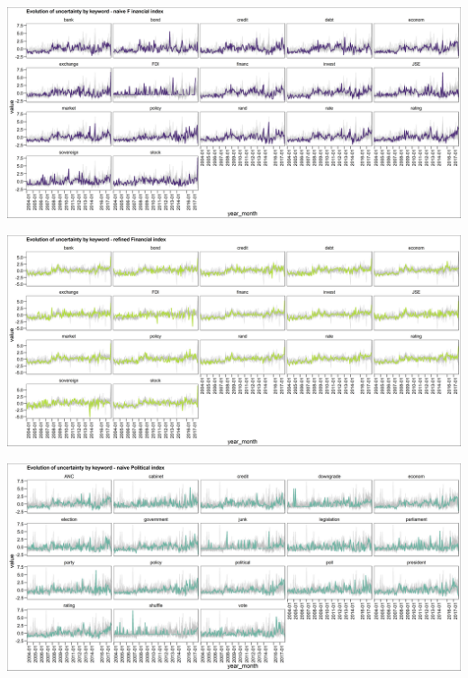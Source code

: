 \documentclass[11pt,preprint, authoryear]{elsarticle}
\let\origfigure\figure
\let\endorigfigure\endfigure
\renewenvironment{figure}[1][2] {
    \expandafter\origfigure\expandafter[H]
} {
    \endorigfigure
}
\numberwithin{equation}{section}
\numberwithin{figure}{section}
\numberwithin{table}{section}
\begin{document}
\begin{figure}
	\centering
	\includegraphics[width=\linewidth, keepaspectratio]{bin/financial_key_naive}\\
	
	\caption{Composite Financial market uncertainty naive index. \label{fig_fin_key_n}}
\end{figure}

\begin{figure}
	\centering
	\includegraphics[width=\linewidth, keepaspectratio]{bin/financial_key_refine}\\
	
	\caption{Composite Financial market uncertainty refined index. \label{fig_fin_key_r}}
\end{figure}

\begin{figure}
	\centering
	\includegraphics[width=\linewidth, keepaspectratio]{bin/pol_key_naive}\\
	
	\caption{Composite Political uncertainty naive index. \label{fig_pol_key_n}}
\end{figure}
\end{document}
